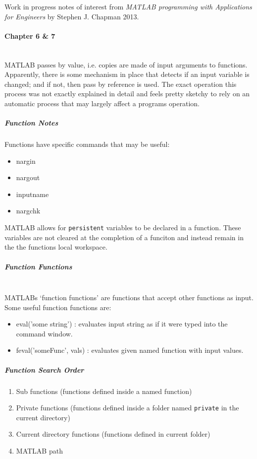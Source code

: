 \documentclass[12pt]{article}
\begin{document}
Work in progress notes of interest from \emph{MATLAB programming with Applications for Engineers} by Stephen J. Chapman 2013.

\paragraph{Chapter 6 \& 7} \ \\
MATLAB passes by value, i.e. copies are made of input arguments to functions. 
Apparently, there is some mechanism in place that detects if an input variable is changed; and if not, then pass by reference is used.
The exact operation this process was not exactly explained in detail and feels pretty sketchy to rely on an automatic process that may largely affect a programs operation.

\subparagraph{Function Notes}
Functions have specific commands that may be useful:
\begin{itemize}
\item nargin
\item nargout
\item inputname
\item nargchk
\end{itemize}

MATLAB allows for \verb|persistent| variables to be declared in a function.
These variables are not cleared at the completion of a funciton and instead remain in the the functions local workspace.

\subparagraph{Function Functions} \ \\
MATLABs `function functions' are functions that accept other functions as input.
Some useful function functions are:
\begin{itemize}
\item eval('some string') : evaluates input string as if it were typed into the command window.
\item feval('someFunc', vals) : evaluates given named function with input values.
\end{itemize}

\subparagraph{Function Search Order}
\begin{enumerate}
\item Sub functions (functions defined inside a named function)
\item Private functions (functions defined inside a folder named \verb|private| in the current directory)
\item Current directory functions (functions defined in current folder)
\item MATLAB path
\end{enumerate}
\end{document}
